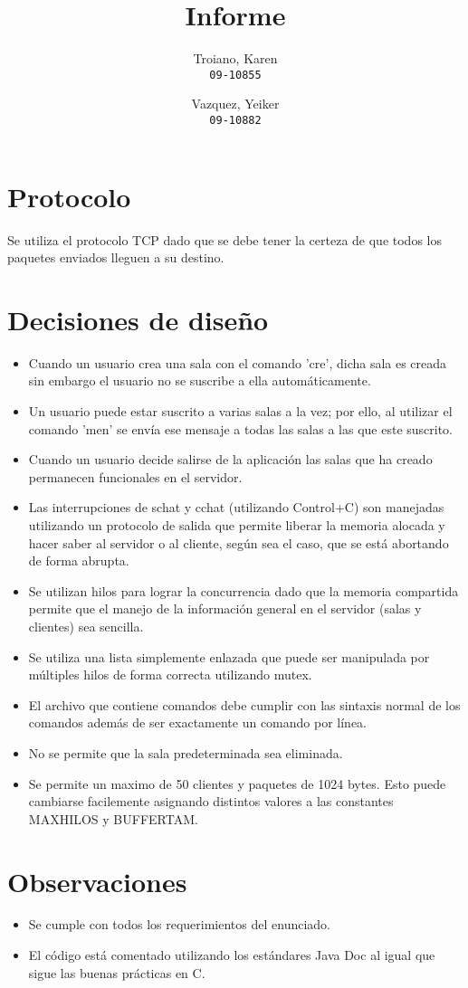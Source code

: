 \documentclass[a4paper]{article}
\title{Informe}
\author{
  Troiano, Karen\\
  \texttt{09-10855}
  \and
  Vazquez, Yeiker\\
  \texttt{09-10882}
}
\begin{document}
\maketitle

\section{Protocolo}

Se utiliza el protocolo TCP dado que se debe tener la certeza de que todos los paquetes enviados lleguen a su destino.

\section{Decisiones de diseño}
\begin{itemize}
\item Cuando un usuario crea una sala con el comando 'cre', dicha sala es creada sin embargo el usuario no se suscribe a ella automáticamente.
\item Un usuario puede estar suscrito a varias salas a la vez; por ello, al utilizar el comando 'men' se envía ese mensaje a todas las salas a las que este suscrito.
\item Cuando un usuario decide salirse de la aplicación las salas que ha creado permanecen funcionales en el servidor.
\item Las interrupciones de schat y cchat (utilizando Control+C) son manejadas utilizando un protocolo de salida que permite liberar la memoria alocada y hacer saber al servidor o al cliente, según sea el caso, que se está abortando de forma abrupta.
\item Se utilizan hilos para lograr la concurrencia dado que la memoria compartida permite que el manejo de la información general en el servidor (salas y clientes) sea sencilla.
\item Se utiliza una lista simplemente enlazada que puede ser manipulada por múltiples hilos de forma correcta utilizando mutex.
\item El archivo que contiene comandos debe cumplir con las sintaxis normal de los comandos además de ser exactamente un comando por línea.
\item No se permite que la sala predeterminada sea eliminada.
\item Se permite un maximo de 50 clientes y paquetes de 1024 bytes. Esto puede cambiarse facilemente asignando distintos valores a las constantes MAXHILOS y BUFFERTAM.
\end{itemize}

\section{Observaciones}
\begin{itemize}
\item Se cumple con todos los requerimientos del enunciado.
\item El código está comentado utilizando los estándares Java Doc al igual que sigue las buenas prácticas en C.
\end{itemize}
\end{document}
